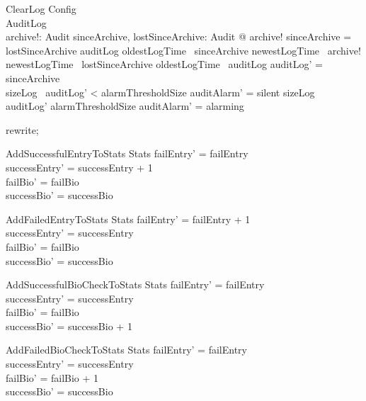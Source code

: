 \begin{schema}{ClearLog}
  Config\\
  \Delta AuditLog\\
  archive!: \finset  Audit
\where
  \exists  sinceArchive, lostSinceArchive: \finset  Audit @
    archive! \cup  sinceArchive = lostSinceArchive \cup  auditLog \land
    oldestLogTime~ sinceArchive \geq  newestLogTime~ archive! \land
    newestLogTime~ lostSinceArchive \leq  oldestLogTime~ auditLog \land
    auditLog' = sinceArchive\\
  sizeLog~ auditLog' < alarmThresholdSize \land
  auditAlarm' = silent \lor  sizeLog~ auditLog' \geq  alarmThresholdSize \land  auditAlarm' = alarming
\end{schema}

\begin{zproof}
rewrite;
\end{zproof}

\begin{schema}{AddSuccessfulEntryToStats}
  \Delta Stats
\where
  failEntry' = failEntry\\
  successEntry' = successEntry + 1\\
  failBio' = failBio\\
  successBio' = successBio
\end{schema}

\begin{schema}{AddFailedEntryToStats}
  \Delta Stats
\where
  failEntry' = failEntry + 1\\
  successEntry' = successEntry\\
  failBio' = failBio\\
  successBio' = successBio
\end{schema}

\begin{schema}{AddSuccessfulBioCheckToStats}
  \Delta Stats
\where
  failEntry' = failEntry\\
  successEntry' = successEntry\\
  failBio' = failBio\\
  successBio' = successBio + 1
\end{schema}

\begin{schema}{AddFailedBioCheckToStats}
  \Delta Stats
\where
  failEntry' = failEntry\\
  successEntry' = successEntry\\
  failBio' = failBio + 1\\
  successBio' = successBio
\end{schema}

